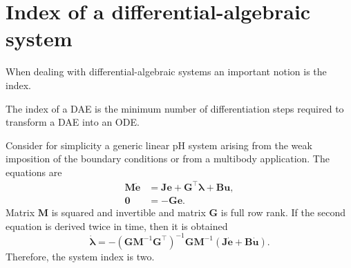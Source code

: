 \section{Index of a differential-algebraic system}\label{sec:DAE_index}
When dealing with differential-algebraic systems an important notion is the index.
\begin{definition}
	The index of a DAE is the minimum number of differentiation steps required to transform a DAE into an ODE.
\end{definition}
Consider for simplicity a generic linear pH system arising from the weak imposition of the boundary conditions or from a multibody application. The equations are
\begin{equation*}
\begin{aligned}
\mathbf{M} \dot{\mathbf{e}} &=  \mathbf{J}\mathbf{e} + \mathbf{G}^\top \bm{\lambda} + \mathbf{B}\mathbf{u}, \\ 
\mathbf{0} &= -\mathbf{G}\mathbf{e}.
\end{aligned}
\end{equation*}
Matrix $\mathbf{M}$ is squared and invertible and matrix $\mathbf{G}$ is full row rank. If the second equation is derived twice in time, then it is obtained
\[\dot{\bm{\lambda}} = - (\mathbf{G} \mathbf{M}^{-1} \mathbf{G}^\top)^{-1} \mathbf{G} \mathbf{M}^{-1} (\mathbf{J} \dot{\mathbf{e}} + \mathbf{B}\dot{\mathbf{u}}).
\]
Therefore, the system index is two.  